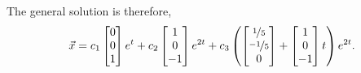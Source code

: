 \begin{example}
The general solution is therefore,
\begin{equation*}
\vec{x} =
c_1
\begin{bmatrix} 0 \\ 0 \\ 1 \end{bmatrix}
e^t
+
c_2 
\begin{bmatrix} 1 \\ 0 \\ -1 \end{bmatrix}
e^{2t}
+
c_3
\left(
\begin{bmatrix} \nicefrac{1}{5} \\ \nicefrac{-1}{5} \\ 0 \end{bmatrix}
+
\begin{bmatrix} 1 \\ 0 \\ -1 \end{bmatrix}
t
\right)
e^{2t}
.
\end{equation*}
\end{example}

